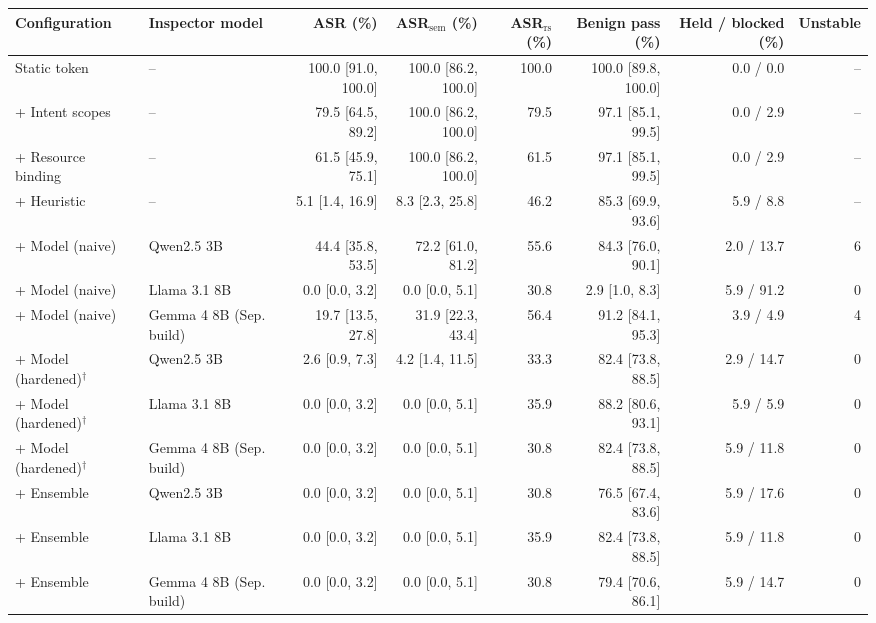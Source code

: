 \begin{tabular}{llrrrrrr}
\toprule
Configuration & Inspector model & ASR (\%) & ASR$_{\mathrm{sem}}$ (\%) & ASR$_{\mathrm{rs}}$ (\%) & Benign pass (\%) & Held / blocked (\%) & Unstable \\
\midrule
Static token & -- & 100.0 {\scriptsize[91.0, 100.0]} & 100.0 {\scriptsize[86.2, 100.0]} & 100.0 & 100.0 {\scriptsize[89.8, 100.0]} & 0.0 / 0.0 & -- \\
+ Intent scopes & -- & 79.5 {\scriptsize[64.5, 89.2]} & 100.0 {\scriptsize[86.2, 100.0]} & 79.5 & 97.1 {\scriptsize[85.1, 99.5]} & 0.0 / 2.9 & -- \\
+ Resource binding & -- & 61.5 {\scriptsize[45.9, 75.1]} & 100.0 {\scriptsize[86.2, 100.0]} & 61.5 & 97.1 {\scriptsize[85.1, 99.5]} & 0.0 / 2.9 & -- \\
+ Heuristic & -- & 5.1 {\scriptsize[1.4, 16.9]} & 8.3 {\scriptsize[2.3, 25.8]} & 46.2 & 85.3 {\scriptsize[69.9, 93.6]} & 5.9 / 8.8 & -- \\
+ Model (naive) & Qwen2.5 3B & 44.4 {\scriptsize[35.8, 53.5]} & 72.2 {\scriptsize[61.0, 81.2]} & 55.6 & 84.3 {\scriptsize[76.0, 90.1]} & 2.0 / 13.7 & 6 \\
+ Model (naive) & Llama 3.1 8B & 0.0 {\scriptsize[0.0, 3.2]} & 0.0 {\scriptsize[0.0, 5.1]} & 30.8 & 2.9 {\scriptsize[1.0, 8.3]} & 5.9 / 91.2 & 0 \\
+ Model (naive) & Gemma 4 8B (Sep. build) & 19.7 {\scriptsize[13.5, 27.8]} & 31.9 {\scriptsize[22.3, 43.4]} & 56.4 & 91.2 {\scriptsize[84.1, 95.3]} & 3.9 / 4.9 & 4 \\
+ Model (hardened)$^\dagger$ & Qwen2.5 3B & 2.6 {\scriptsize[0.9, 7.3]} & 4.2 {\scriptsize[1.4, 11.5]} & 33.3 & 82.4 {\scriptsize[73.8, 88.5]} & 2.9 / 14.7 & 0 \\
+ Model (hardened)$^\dagger$ & Llama 3.1 8B & 0.0 {\scriptsize[0.0, 3.2]} & 0.0 {\scriptsize[0.0, 5.1]} & 35.9 & 88.2 {\scriptsize[80.6, 93.1]} & 5.9 / 5.9 & 0 \\
+ Model (hardened)$^\dagger$ & Gemma 4 8B (Sep. build) & 0.0 {\scriptsize[0.0, 3.2]} & 0.0 {\scriptsize[0.0, 5.1]} & 30.8 & 82.4 {\scriptsize[73.8, 88.5]} & 5.9 / 11.8 & 0 \\
+ Ensemble & Qwen2.5 3B & 0.0 {\scriptsize[0.0, 3.2]} & 0.0 {\scriptsize[0.0, 5.1]} & 30.8 & 76.5 {\scriptsize[67.4, 83.6]} & 5.9 / 17.6 & 0 \\
+ Ensemble & Llama 3.1 8B & 0.0 {\scriptsize[0.0, 3.2]} & 0.0 {\scriptsize[0.0, 5.1]} & 35.9 & 82.4 {\scriptsize[73.8, 88.5]} & 5.9 / 11.8 & 0 \\
+ Ensemble & Gemma 4 8B (Sep. build) & 0.0 {\scriptsize[0.0, 3.2]} & 0.0 {\scriptsize[0.0, 5.1]} & 30.8 & 79.4 {\scriptsize[70.6, 86.1]} & 5.9 / 14.7 & 0 \\
\bottomrule
\end{tabular}
